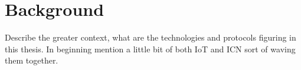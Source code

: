 \section{Background}

Describe the greater context, what are the technologies and protocols figuring in this thesis.
In beginning mention a little bit of both IoT and ICN sort of waving them together.








%
